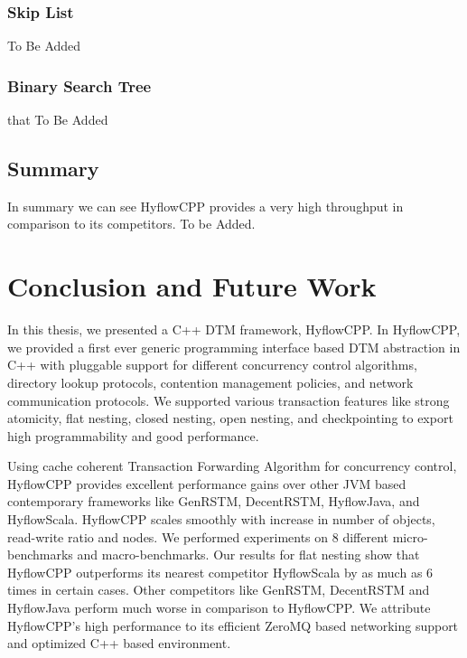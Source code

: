 \documentclass[12pt,english]{report}
\begin{document}
\subsection{Skip List}

To Be Added 

\subsection{Binary Search Tree}
that
To Be Added

\section{Summary}

In summary we can see HyflowCPP provides a very high throughput in comparison to its competitors.
To be Added.

\chapter{Conclusion and Future Work}\label{chap:conclusion}

In this thesis, we presented a C++ DTM framework, HyflowCPP. In HyflowCPP, we provided a first ever generic programming interface based DTM abstraction in C++ with pluggable support for different concurrency control algorithms, directory lookup protocols, contention management policies, and network communication protocols.
We supported various transaction features like strong atomicity, flat nesting, closed nesting, open nesting, and checkpointing to export high programmability and good performance.

Using cache coherent Transaction Forwarding Algorithm for concurrency control, HyflowCPP provides excellent performance gains over other JVM based contemporary frameworks like GenRSTM, DecentRSTM, HyflowJava, and HyflowScala. HyflowCPP scales smoothly with increase in number of objects, read-write ratio and nodes. We performed experiments on 8 different micro-benchmarks and macro-benchmarks. Our results for flat nesting show that HyflowCPP outperforms its nearest competitor HyflowScala by as much as 6 times in certain cases. Other competitors like GenRSTM, DecentRSTM and HyflowJava perform much worse in comparison to HyflowCPP. We attribute HyflowCPP's high performance to its efficient ZeroMQ based networking support and optimized C++ based environment.
\end{document}
